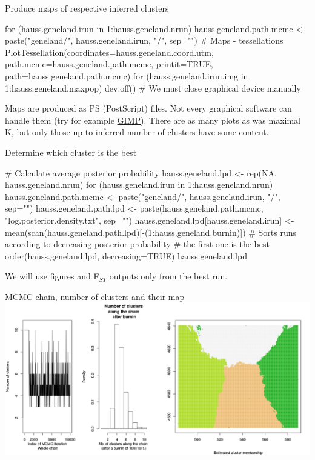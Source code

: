 \documentclass[compress, ucs, xelatex, 11pt, xcolor=svgnames,
  hyperref={
    bookmarks=true,
    unicode=true,
    colorlinks=true,
    pdftitle={Molecular data in R},
    plainpages=false,
    pdfauthor={Vojtech Zeisek},
    pdfsubject={Course about phylogeny and evolution in R},
    pdfcreator={XeLaTeX},
    pdfkeywords={R, evolution, phylogeny, molecular data},
    linkcolor=Tomato,
    anchorcolor=SaddleBrown,
    citecolor=Goldenrod,
    filecolor=DarkMagenta,
    menucolor=Sienna,
    urlcolor=DarkTurquoise,
    pdftex},
  url={hyphens, lowtilde} %
  ]{beamer}
\begin{document}
\begin{frame}[fragile]{Produce maps of respective inferred clusters}
  \begin{spluscode}
    for (hauss.geneland.irun in 1:hauss.geneland.nrun) {
      hauss.geneland.path.mcmc <- paste("geneland/",
        hauss.geneland.irun, "/", sep="")
      # Maps - tessellations
      PlotTessellation(coordinates=hauss.geneland.coord.utm,
        path.mcmc=hauss.geneland.path.mcmc, printit=TRUE,
        path=hauss.geneland.path.mcmc)
      for (hauss.geneland.irun.img in 1:hauss.geneland.maxpop) {
        dev.off() } # We must close graphical device manually
      }
  \end{spluscode}
\vfil
Maps are produced as PS (PostScript) files. Not every graphical software can handle them (try for example \href{https://www.gimp.org/}{GIMP}). There are as many plots as was maximal K, but only those up to inferred number of clusters have some content.
\end{frame}

\begin{frame}[fragile]{Determine which cluster is the best}
  \begin{spluscode}
    # Calculate average posterior probability
    hauss.geneland.lpd <- rep(NA, hauss.geneland.nrun)
    for (hauss.geneland.irun in 1:hauss.geneland.nrun) {
      hauss.geneland.path.mcmc <- paste("geneland/",
        hauss.geneland.irun, "/", sep="")
      hauss.geneland.path.lpd <- paste(hauss.geneland.path.mcmc,
        "log.posterior.density.txt", sep="")
      hauss.geneland.lpd[hauss.geneland.irun] <- 
        mean(scan(hauss.geneland.path.lpd)[-(1:hauss.geneland.burnin)])
      }
    # Sorts runs according to decreasing posterior probability
    # the first one is the best
    order(hauss.geneland.lpd, decreasing=TRUE)
    hauss.geneland.lpd
  \end{spluscode}
\vfil
We will use figures and F$_{ST}$ outputs only from the best run.
\end{frame}

\begin{frame}{MCMC chain, number of clusters and their map}
\includegraphics[width=\textwidth]{geneland1.png}
\end{frame}
\end{document}

